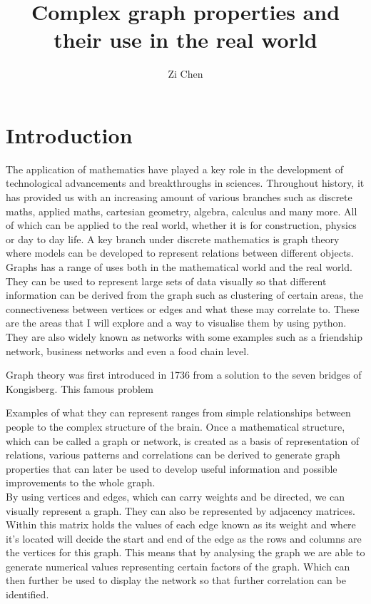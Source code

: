 \documentclass[12pt]{article}
\title{Complex graph properties and their use in the real world}
\author{Zi Chen}
\date{}
\begin{document}
\maketitle

\section{Introduction}
The application of mathematics have played a key role in the development of technological advancements and breakthroughs in sciences. Throughout history, it has provided us with an increasing amount of various branches such as discrete maths, applied maths, cartesian geometry, algebra, calculus and many more. All of which can be applied to the real world, whether it is for construction, physics or day to day life. A key branch under discrete mathematics is graph theory where models can be developed to represent relations between different objects. Graphs has a range of uses both in the mathematical world and the real world. They can be used to represent large sets of data visually so that different information can be derived from the graph such as clustering of certain areas, the connectiveness between vertices or edges and what these may correlate to. These are the areas that I will explore and a way to visualise them by using python. They are also widely known as networks with some examples such as a friendship network, business networks and even a food chain level.

Graph theory was first introduced in 1736 from a solution to the seven bridges of Kongisberg. This famous problem 

Examples of what they can represent ranges from simple relationships between people to the complex structure of the brain. Once a mathematical structure, which can be called a graph or network, is created as a basis of representation of relations, various patterns and correlations can be derived to generate graph properties that can later be used to develop useful information and possible improvements to the whole graph.  
\\

By using vertices and edges, which can carry weights and be directed, we can visually represent a graph. They can also be represented by adjacency matrices. Within this matrix holds the values of each edge known as its weight and where it's located will decide the start and end of the edge as the rows and columns are the vertices for this graph. This means that by analysing the graph we are able to generate numerical values representing certain factors of the graph. Which can then further be used to display the network so that further correlation can be identified.
\end{document}
